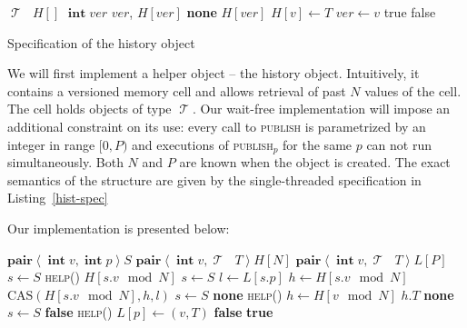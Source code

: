 \documentclass[a4paper,11pt]{article}
\def\none{\textbf{none} }
\def\T{\ensuremath{\operatorname{\mathcal{T}}}\text{ }}
\def\int{\ensuremath{\operatorname{\textbf{int}}}}
\newcommand{\fn}[1]{\textsc{#1}}
\begin{document}
\begin{Listing}[!h]
\begin{algorithmic}[1]
	\State $\T H[]$
	\State $\int ver$
		\State \Return $ver$, $H[ver]$
	\EndFunction
			\State \Return \none
		\Else
		\State \Return $H[ver]$
		\EndIf
	\EndFunction
		\State $H[v] \gets T$
			\State $ver \gets v$
			\State \Return true
		\Else
			\State \Return false
		\EndIf
	\EndFunction
\end{algorithmic}
\caption{Specification of the history object}
\label{hist-spec}
\end{Listing}
We will first implement a helper object -- the history object. Intuitively, it contains a versioned memory cell and allows retrieval of past $N$ values of the cell. The cell holds objects of type \T.
Our wait-free implementation will impose an additional constraint on its use: every call to \fn{publish} is parametrized by an integer in range $[0,P)$ and executions of \fn{publish$_p$} for the same $p$ can not run simultaneously.
	Both $N$ and $P$ are known when the object is created. The exact semantics of the structure are given by the single-threaded specification in Listing~\ref{hist-spec}

\FloatBarrier

Our implementation is presented below:

\begin{algorithmic}[1]
	\State $\textbf{pair}\left<\int v, \int p\right> S$ 
	\State $\textbf{pair}\left<\int v, \T T\right> H[N]$ 
	\State $\textbf{pair}\left<\int v, \T T\right> L[P]$ 
		\State $s \gets S$ 
		\State \fn{help}()
		\State \Return $H[s.v \mod N]$
	\EndFunction
		\State $s \gets S$
		\State $l \gets L[s.p]$
		\State $h \gets H[s.v \mod N]$
		\State $\text{CAS}(H[s.v \mod N], h, l)$ \label{hist-help-cas}
		\EndIf
	\EndFunction
		\State $s \gets S$ \label{hist-get-notyet-sp} 
		\State \Return \none \label{hist-get-notyet} 
		\EndIf
		\State \fn{help}()
		\State $h \gets H[v \mod N]$
			\State \Return $h.T$
		\Else
			\State \Return \none \label{hist-get-tooold}
		\EndIf
	\EndFunction
		\State $s \gets S$ \label{hist-pub-earlier-sp} 
			\State \Return \textbf{false} \label{hist-pub-earlier-exit}
		\EndIf
		\State \fn{help}()
		\State $L[p] \gets (v, T)$ \label{hist-pub-latest}
		 \label{hist-pub-later-sp}
			\State \Return \textbf{false}
		\EndIf
		\State \Return \textbf{true}
	\EndFunction
\end{algorithmic}
\end{document}
